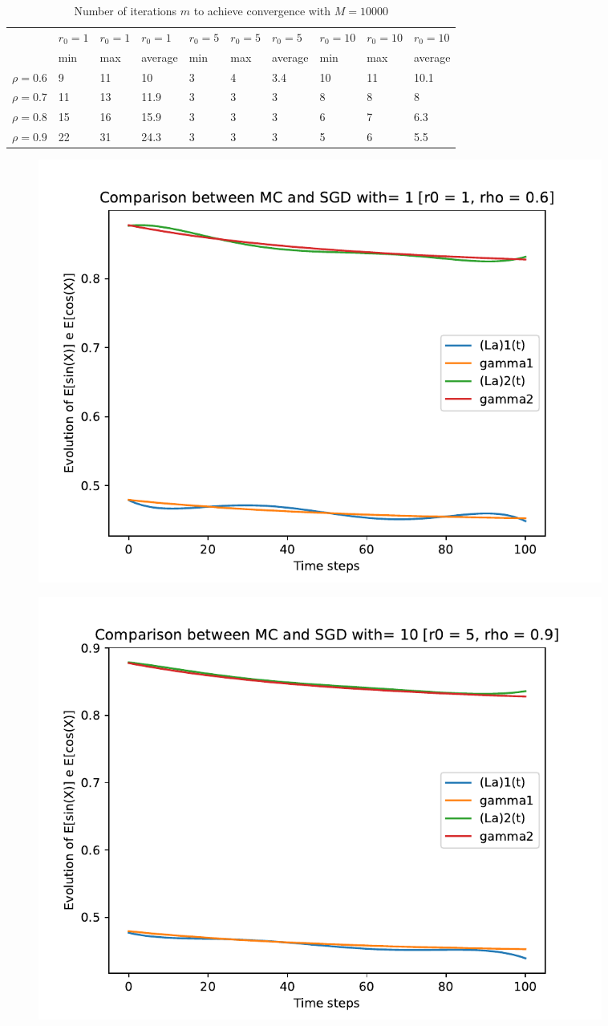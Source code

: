 \documentclass[a4paper,11pt,openright]{report}
\begin{document}
\begin{table}[H]
\centering
\addtolength{\leftskip}{-1.5cm}
\addtolength{\rightskip}{-1.5cm}
\begin{tabular}{|c|lllllllll|}
\hline
$ $ & $r_0 = 1$ & $r_0 = 1$ & $r_0 = 1$ & $r_0 = 5$ & $r_0 = 5$ & $r_0 = 5$ & $r_0 = 10$ & $r_0 = 10$ & $r_0 = 10$  \\
$ $ & min & max & average & min & max & average & min & max & average \\ 
\hline
$\rho = 0.6$ & 9 & 11 & 10 & 3 & 4 & 3.4 & 10 & 11 & 10.1 \\

$\rho = 0.7$ & 11 & 13 & 11.9 & 3 & 3 & 3 & 8 & 8 & 8\\

$\rho = 0.8$ & 15 & 16 & 15.9 & 3 & 3 & 3 & 6 & 7 & 6.3\\

$\rho = 0.9$ & 22 & 31 & 24.3 & 3 & 3 & 3 & 5 & 6 & 5.5\\
\hline
\end{tabular}
\caption{Number of iterations $m$ to achieve convergence with $M = 10000$}
\end{table}
\begin{figure}[H]
\centering
\includegraphics[width=0.9\textwidth]{images/graphics T = 1/n = 5, M = 1 sine and cosine.pdf}
\end{figure}
\begin{figure}[H]
\centering
\includegraphics[width=0.9\textwidth]{images/graphics T = 1/n = 5, M = 10 sine and cosine.pdf}
\end{figure}
\end{document}
